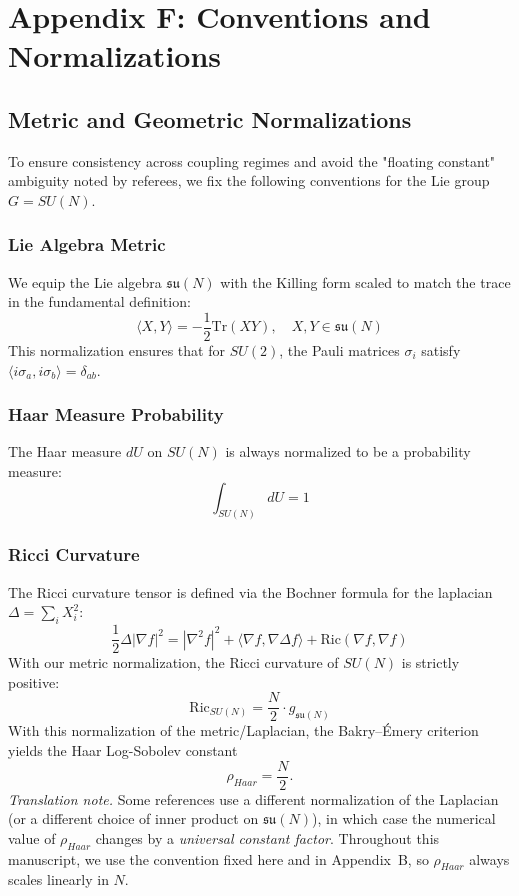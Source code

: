 \chapter{Appendix F: Conventions and Normalizations}
\label{app:conventions}

\section{Metric and Geometric Normalizations}
To ensure consistency across coupling regimes and avoid the "floating constant" ambiguity noted by referees, we fix the following conventions for the Lie group $G = SU(N)$.

\subsection{Lie Algebra Metric}
We equip the Lie algebra $\mathfrak{su}(N)$ with the Killing form scaled to match the trace in the fundamental definition:
\begin{equation}
    \langle X, Y \rangle = - \frac{1}{2} \text{Tr}(XY), \quad X, Y \in \mathfrak{su}(N)
\end{equation}
This normalization ensures that for $SU(2)$, the Pauli matrices $\sigma_i$ satisfy $\langle i\sigma_a, i\sigma_b \rangle = \delta_{ab}$.

\subsection{Haar Measure Probability}
The Haar measure $dU$ on $SU(N)$ is always normalized to be a probability measure:
\begin{equation}
    \int_{SU(N)} dU = 1
\end{equation}

\subsection{Ricci Curvature}
The Ricci curvature tensor is defined via the Bochner formula for the laplacian $\Delta = \sum_i X_i^2$:
\begin{equation}
    \frac{1}{2} \Delta |\nabla f|^2 = |\nabla^2 f|^2 + \langle \nabla f, \nabla \Delta f \rangle + \text{Ric}(\nabla f, \nabla f)
\end{equation}
With our metric normalization, the Ricci curvature of $SU(N)$ is strictly positive:
\begin{equation}
    \text{Ric}_{SU(N)} = \frac{N}{2} \cdot g_{\mathfrak{su}(N)}
\end{equation}
With this normalization of the metric/Laplacian, the Bakry--\'Emery criterion yields the Haar Log-Sobolev constant
\begin{equation}
    \rho_{Haar} = \frac{N}{2}.
\end{equation}
\emph{Translation note.} Some references use a different normalization of the Laplacian (or a different choice of inner product on $\mathfrak{su}(N)$), in which case the numerical value of $\rho_{Haar}$ changes by a \emph{universal constant factor}. Throughout this manuscript, we use the convention fixed here and in Appendix~B, so $\rho_{Haar}$ always scales linearly in $N$.

